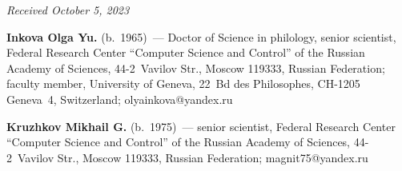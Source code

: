 \vspace*{-6pt}

\hfill{\small\textit{Received October 5, 2023}} 


\Contr

\vspace*{-4pt}

\noindent
\textbf{Inkova Olga Yu.} (b.\ 1965)~--- Doctor of Science in philology, senior scientist, Federal 
Research Center ``Computer Science and Control'' of the Russian Academy of Sciences,  
44-2~Vavilov Str., Moscow 119333, Russian Federation; faculty member, University of Geneva, 
22~Bd des Philosophes, CH-1205 Geneva~4, Switzerland; \mbox{olyainkova@yandex.ru}

\vspace*{3pt}

\noindent
\textbf{Kruzhkov Mikhail G.} (b.\ 1975)~--- senior scientist, Federal Research Center ``Computer 
Science and Control'' of the Russian Academy of Sciences, 44-2~Vavilov Str., Moscow 119333, 
Russian Federation; \mbox{magnit75@yandex.ru}


\label{end\stat}

\renewcommand{\bibname}{\protect\rm Литература} 